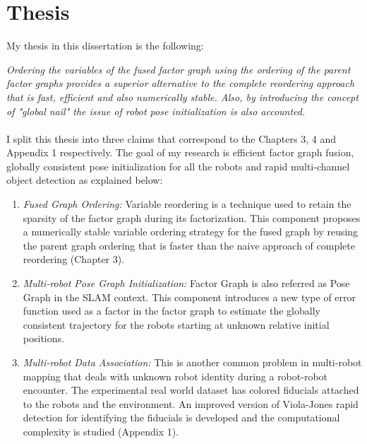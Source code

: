 \section{Thesis}

My thesis in this dissertation is the following:

\begin{center}
\textit{Ordering the variables of the fused factor graph using the ordering of the parent factor graphs provides a superior alternative to the complete reordering approach that is fast, efficient and also numerically stable. Also, by introducing the concept of "global nail" the issue of robot pose initialization is also accounted.}
\end{center}

\paragraph{}
I split this thesis into three claims that correspond to the Chapters 3, 4 and Appendix 1 respectively. The goal of my research is efficient factor graph fusion, globally consistent pose initialization for all the robots and rapid multi-channel object detection as explained below:

\begin{enumerate}
\item \textit{Fused Graph Ordering:} Variable reordering is a technique used to retain the sparsity of the factor graph during its factorization. This component proposes a numerically stable variable ordering strategy for the fused graph by reusing the parent graph ordering that is faster than the naive approach of complete reordering (Chapter 3). 

\item \textit{Multi-robot Pose Graph Initialization:} Factor Graph is also referred as Pose Graph in the SLAM context. This component introduces a new type of error function used as a factor in the factor graph to estimate the globally consistent trajectory for the robots starting at unknown relative initial positions.

\item \textit{Multi-robot Data Association:} This is another common problem in multi-robot mapping that deals with unknown robot identity during a robot-robot encounter. The experimental real world dataset has colored fiducials attached to the robots and the environment. An improved version of Viola-Jones rapid detection \cite{violajones} for identifying the fiducials is developed and the computational complexity is studied (Appendix 1). 
\end{enumerate}

